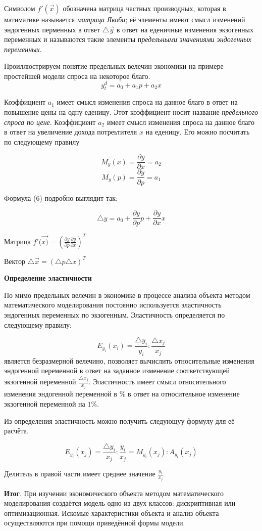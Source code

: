 \documentclass[12pt,a4paper]{article}
\begin{document}
Символом $f'(\vec{x})$ обозначена матрица частных производных, которая в матиматике называется \textit{матрица Якоби}; её элементы имеют смысл изменений эндогенных перменных в ответ $\triangle \vec{y}$ в ответ на еденичные изменения экзогенных переменных и называются такие элементы п\textit{редельными значениями эндогенных переменных}. 

Проиллюстрируем понятие предельных велечин экономики на примере простейшей модели спроса на некоторое благо.
$$y_t^d = a_0 + a_1 p + a_2  x$$

Коэффициент $a_1$ имеет смысл изменения спроса на данное благо в ответ на повышение цены на одну еденицу. Этот коэффициент носит название \textit{предельного спроса по цене}. Коэффициент $a_2$ имеет смысл изменения спроса на данное благо в ответ на увеличение дохода потреьтителя $x$ на еденицу. Его можно посчитать по следующему правилу

$$M_y(x) = \frac{\partial y}{\partial x} = a_2$$
$$M_y(p) = \frac{\partial y}{\partial p} = a_1$$

Формула (6) подробно выглядит так:

$$\triangle y = a_0 + \frac{\partial y}{\partial p} p + \frac{\partial y}{\partial x} x$$

Матрица $f'(\vec{x)} = \left(\frac{\partial y}{\partial p} \frac{\partial y}{\partial x} \right)^T$

Вектор $\triangle \vec{x} = (\triangle p \triangle x)^T$

\begin{center}
\textbf{Определение эластичности}
\end{center}

По мимо предельных велечин в экономике в процессе анализа объекта методом математического моделирования постоянно используется эластичность эндогенных переменных по экзогенным. Эластичность определяется по следующему правилу:

\begin{equation}
E_{y_i}(x_i) = \frac{\triangle y_i}{y_i} : \frac{\triangle x_j}{x_j}
\end{equation}
является безразмерной велечино, позволяет вычислить относительные изменения эндогенной переменной в ответ на заданное изменение соответствующей экзогенной переменной $\displaystyle{\frac{\triangle x_j}{x_j}}$. Эластичность имеет смысл относительного изменения эндогенной переменной в $\%$ в ответ на относительное изменение экзогенной переменной на $1\%$.

Из определения эластичность можно получить следующуу формулу для её расчёта.

$$E_{y_i}(x_j) = \frac{\triangle y_i}{x_j} : \frac{y_i}{x_j} = M_{y_i}(x_j) : A_{y_i}(x_j)$$

Делитель в правой части имеет среднее значение $\displaystyle{\frac{y_i}{x_j}}$

\textbf{Итог}. При изучении экономического объекта методом математического моделирования создаётся модель одно из двух классов: дискриптивная или оптимизационная. Искомые характеристики объекта и анализ объекта осуществляются при помощи приведённой формы модели.
\end{document}
